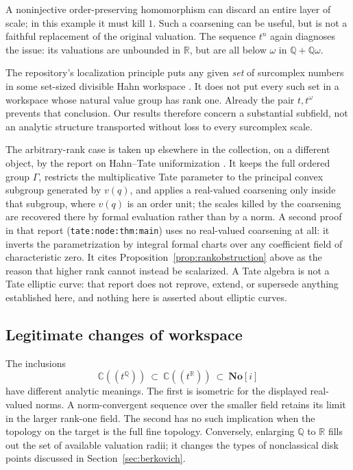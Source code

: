 \documentclass[11pt,a4paper]{article}
\numberwithin{equation}{section}
\theoremstyle{definition}
\theoremstyle{remark}
\newcommand{\No}{\mathbf{No}}
\newcommand{\C}{\mathbb C}
\newcommand{\R}{\mathbb R}
\newcommand{\Q}{\mathbb Q}
\begin{document}
A noninjective order-preserving homomorphism can discard an entire layer of
scale; in this example it must kill $1$. Such a coarsening can be useful, but
is not a faithful replacement of the original valuation. The sequence $t^n$
again diagnoses the issue: its valuations are unbounded in $\R$, but are all
below $\omega$ in $\Q+\Q\omega$.

The repository's localization principle puts any given \emph{set} of
surcomplex numbers in some set-sized divisible Hahn workspace
\cite{RepoFoundations}. It does not put every such set in a workspace whose
natural value group has rank one. Already the pair $t,t^\omega$ prevents
that conclusion. Our results therefore concern a substantial subfield, not an
analytic structure transported without loss to every surcomplex scale.

The arbitrary-rank case is taken up elsewhere in the collection, on a
different object, by the report on Hahn--Tate uniformization
\cite{RepoTate}. It keeps the full ordered group $\Gamma$, restricts the
multiplicative Tate parameter to the principal convex subgroup generated by
$v(q)$, and applies a real-valued coarsening only inside that subgroup,
where $v(q)$ is an order unit; the scales killed by the coarsening are
recovered there by formal evaluation rather than by a norm. A second proof
in that report (\texttt{tate:node:thm:main}) uses no real-valued coarsening
at all: it inverts the parametrization by integral formal charts over any
coefficient field of characteristic zero. It cites
Proposition~\ref{prop:rankobstruction} above as the reason that higher rank
cannot instead be scalarized. A Tate algebra is not a Tate elliptic curve:
that report does not reprove, extend, or supersede anything established
here, and nothing here is asserted about elliptic curves.

\subsection{Legitimate changes of workspace}
The inclusions
\[
 \C((t^\Q))\ \subset\ \C((t^\R))\ \subset\ \No[i]
\]
have different analytic meanings. The first is isometric for the displayed
real-valued norms. A norm-convergent sequence over the smaller field retains
its limit in the larger rank-one field. The second has no such implication
when the topology on the target is the full fine topology. Conversely, enlarging
$\Q$ to $\R$ fills out the set of available valuation radii; it changes the
types of nonclassical disk points discussed in Section~\ref{sec:berkovich}.
\end{document}
